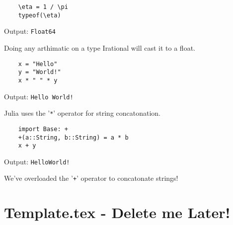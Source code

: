 \documentclass{report}
\begin{document}

\begin{lstlisting}
	\eta = 1 / \pi
	typeof(\eta)
\end{lstlisting}
Output: \verb|Float64|

Doing any arthimatic on a type Irational will cast it to a float.

\begin{lstlisting}
	x = "Hello"
	y = "World!"
	x * " " * y
\end{lstlisting}
Output: \verb|Hello World!|

Julia uses the '\verb|*|' operator for string concatonation.

\begin{lstlisting}
	import Base: +
	+(a::String, b::String) = a * b
	x + y
\end{lstlisting}
Output: \verb|HelloWorld!|

We've overloaded the '\verb|+|' operator to concatonate strings!












\chapter{Template.tex - Delete me Later!}
\end{document}
